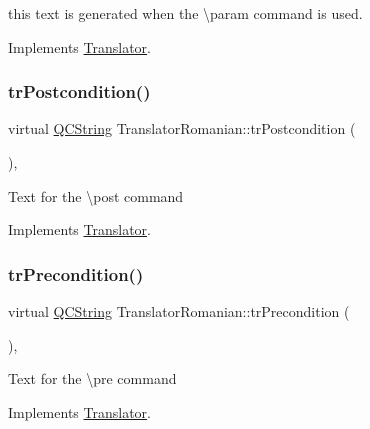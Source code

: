 this text is generated when the \textbackslash{}param command is used. 

Implements \mbox{\hyperlink{class_translator}{Translator}}.

\mbox{\label{class_translator_romanian_a51ac7831b42e48096faa571c852ed466}} 
\subsubsection{\texorpdfstring{trPostcondition()}{trPostcondition()}}
{\footnotesize\ttfamily virtual \mbox{\hyperlink{class_q_c_string}{Q\+C\+String}} Translator\+Romanian\+::tr\+Postcondition (\begin{DoxyParamCaption}{ }\end{DoxyParamCaption})\hspace{0.3cm}{\ttfamily [inline]}, {\ttfamily [virtual]}}

Text for the \textbackslash{}post command 

Implements \mbox{\hyperlink{class_translator}{Translator}}.

\mbox{\label{class_translator_romanian_a221ba0ba0d5f2d9b6bfce8b2f070baf7}} 
\subsubsection{\texorpdfstring{trPrecondition()}{trPrecondition()}}
{\footnotesize\ttfamily virtual \mbox{\hyperlink{class_q_c_string}{Q\+C\+String}} Translator\+Romanian\+::tr\+Precondition (\begin{DoxyParamCaption}{ }\end{DoxyParamCaption})\hspace{0.3cm}{\ttfamily [inline]}, {\ttfamily [virtual]}}

Text for the \textbackslash{}pre command 

Implements \mbox{\hyperlink{class_translator}{Translator}}.

\mbox{\label{class_translator_romanian_a5cb500f167d800e20bbb33d0baef646c}} 
